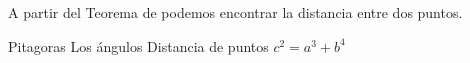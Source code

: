 
\question A partir del Teorema de \fillin \enspace podemos encontrar la
          distancia entre dos puntos.

  \begin{oneparchoices}
    \CorrectChoice Pitagoras
    \choice Los ángulos
    \choice Distancia de puntos
    \choice $c^2 = a^3 + b^4$
  \end{oneparchoices}
  \answerline[A]

